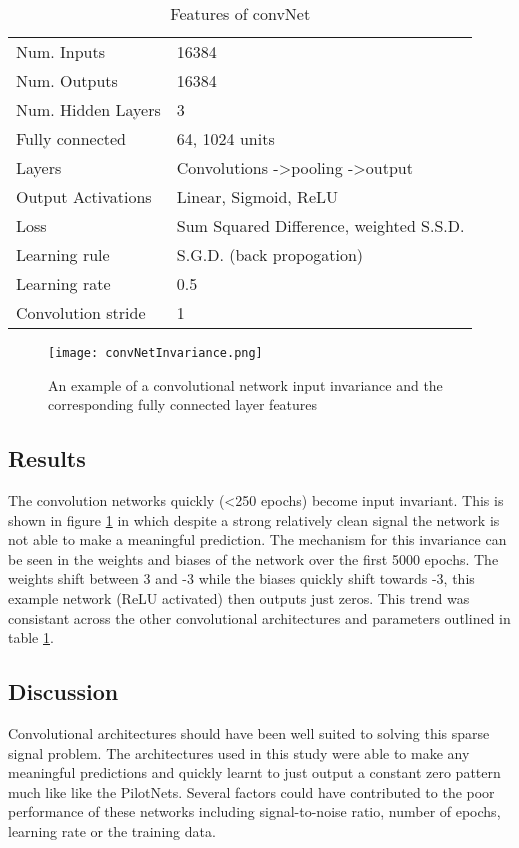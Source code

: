\begin{table}[h]
\centering
\begin{tabular}{ | l | l | }
    \hline
    Num. Inputs & 16384 \\
    Num. Outputs & 16384 \\
    Num. Hidden Layers & 3 \\
    Fully connected & 64, 1024 units \\
    Layers & Convolutions -\textgreater pooling -\textgreater output \\
    Output Activations & Linear, Sigmoid, ReLU \\
    Loss & Sum Squared Difference, weighted S.S.D. \\
    Learning rule & S.G.D. (back propogation) \\
    Learning rate & 0.5 \\
    Convolution stride & 1 \\
    \hline
\end{tabular}
\caption{Features of convNet}
\label{tb:convNetdef}
\end{table}

\begin{figure}[h]
    \centering
    \texttt{[image: convNetInvariance.png]}
    \caption{An example of a convolutional network input invariance and the corresponding fully connected layer features}
    \label{fig:convInputInvariance}
\end{figure}


\subsection{Results}
The convolution networks quickly (\textless 250 epochs) become input invariant.
This is shown in figure \ref{fig:convInputInvariance} in which despite a strong relatively clean signal the network is not able to make a meaningful prediction. 
The mechanism for this invariance can be seen in the weights and biases of the network over the first 5000 epochs.
The weights shift between 3 and -3 while the biases quickly shift towards -3, this example network (ReLU activated) then outputs just zeros.
This trend was consistant across the other convolutional architectures and parameters outlined in table \ref{tb:convNetdef}.


\subsection{Discussion}
Convolutional architectures should have been well suited to solving this sparse signal problem.
The architectures used in this study were able to make any meaningful predictions and quickly learnt to just output a constant zero pattern much like like the PilotNets.
Several factors could have contributed to the poor performance of these networks including signal-to-noise ratio, number of epochs, learning rate or the training data. 

